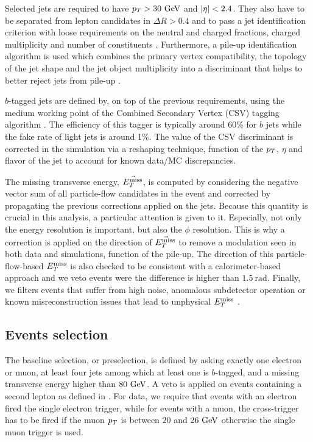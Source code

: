        Selected jets are required to have $p_T > 30 ~\text{GeV}$ and $\left| \eta \right| < 2.4$. They also
       have to be separated from lepton candidates in $\Delta R > 0.4$ and to pass a jet
       identification criterion with loose requirements on the neutral and
       charged fractions, charged multiplicity and number of constituents \cite{JetID}.
       Furthermore, a pile-up identification algorithm is used which combines the primary vertex
       compatibility, the topology of the jet shape and the jet object multiplicity into
       a discriminant that helps to better reject jets from pile-up \cite{PUJetID}.

       $b$-tagged jets are defined by, on top of the previous requirements, using the
       medium working point of the Combined Secondary Vertex (CSV) tagging algorithm \cite{BTagging8TeV}.
       The efficiency of this tagger is typically around 60\% for $b$ jets while the fake
       rate of light jets is around 1\%. The value of the CSV discriminant is corrected in
       the simulation via a reshaping technique, function of the $p_T$, $\eta$ and flavor
       of the jet to account for known data/MC discrepancies.

       The missing transverse energy, $\vec{E_T^\text{miss}}$, is computed by considering the
       negative vector sum of all particle-flow candidates in the event and corrected by
       propagating the previous corrections applied on the jets. Because this quantity is
       crucial in this analysis, a particular attention is given to it. Especially, not only
       the energy resolution is important, but also the $\phi$ resolution. This is why
       a correction is applied on the direction of $\vec{E_T^\text{miss}}$ to remove a modulation seen in
       both data and simulations, function of the pile-up. The direction of this
       particle-flow-based $E_T^\text{miss}$ is also checked to be consistent with a calorimeter-based
       approach and we veto events were the difference is higher than $1.5~\text{rad}$.
       Finally, we filters events that suffer from high noise, anomalous subdetector operation
       or known misreconstruction issues that lead to unphysical $E_T^\text{miss}$ \cite{METperf}.

        \subsection{Events selection}

        The baseline selection, or preselection,
        is defined by asking exactly one electron or muon, at least
        four jets among which at least one is $b$-tagged, and a missing transverse energy higher than $80 ~\text{GeV}$.
        A veto is applied on events containing a second lepton as defined in .
        For data, we require that events with an electron fired the single electron
        trigger, while for events with a muon, the cross-trigger has to be fired
        if the muon $p_T$ is between $20$ and $26~\text{GeV}$ otherwise the single muon trigger
        is used.

